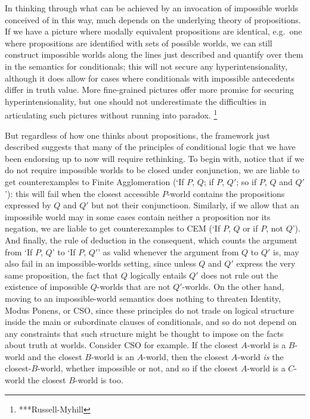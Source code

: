 \documentclass[If.tex]{subfiles}
\begin{document}
In thinking through what can be achieved by an invocation of impossible worlds conceived of in this way, much depends on the underlying theory of propositions.  If we have a picture where modally equivalent propositions are identical, e.g.\ one where propositions are identified with sets of possible worlds, we can still construct impossible worlds along the lines just described and quantify over them in the semantics for conditionals; this will not secure any hyperintensionality, although it does allow for cases where conditionals with impossible antecedents differ in truth value.  More fine-grained pictures offer more promise for securing hyperintensionality, but one should not underestimate the difficulties in articulating such pictures without running into paradox.%
\footnote{***Russell-Myhill}

But regardless of how one thinks about propositions, the framework just described suggests that many of the principles of conditional logic that we have been endorsing up to now will require rethinking.  To begin with, notice that if we do not require impossible worlds to be closed under conjunction, we are liable to get counterexamples to Finite Agglomeration (‘If $P$, $Q$; if $P$, $Q'$; so if $P$, $Q$ and $Q'$’): this will fail when the closest accessible $P$-world contains the propositions expressed by $Q$ and $Q'$ but not their conjunctioon.  Similarly, if we allow that an impossible world may in some cases contain neither a proposition nor its negation, we are liable to get counterexamples to CEM (‘If $P$, $Q$ or if $P$, not $Q$’).  And finally, the rule of deduction in the consequent, which counts the argument from ‘If $P$, $Q$’ to ‘If $P$, $Q'$’ as valid whenever the argument from $Q$ to $Q'$ is, may also fail in an impossible-worlds setting, since unless $Q$ and $Q'$ express the very same proposition, the fact that $Q$ logically entails $Q'$ does not rule out the existence of impossible $Q$-worlds that are not $Q'$-worlds.  On the other hand, moving to an impossible-world semantics does nothing to threaten Identity, Modus Ponens, or CSO, since these principles do not trade on logical structure inside the main or subordinate clauses of conditionals, and so do not depend on any constraints that such structure might be thought to impose on the facts about truth at worlds.  Consider CSO for example.  If the closest $A$-world is a $B$-world and the closest $B$-world is an $A$-world, then the closest $A$-world \emph{is} the closest-$B$-world, whether impossible or not, and so if the closest $A$-world is a $C$-world the closest $B$-world is too.  
\end{document}

